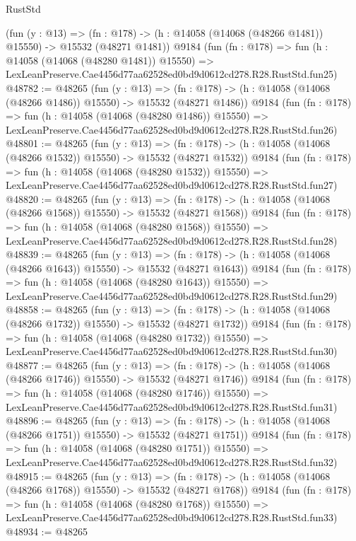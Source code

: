 \begin{lexlean}{RustStd}
\begin{coremodule}
    (fun (y : @13) =>
    (fn : @178) -> (h : @14058 (@14068 (@48266 @1481)) @15550) -> @15532 (@48271 @1481))
    @9184
    (fun (fn : @178) =>
    fun (h : @14058 (@14068 (@48280 @1481)) @15550) =>
    LexLeanPreserve.Cae4456d77aa62528ed0bd9d0612cd278.R28.RustStd.fun25)
@48782 := @48265
    (fun (y : @13) =>
    (fn : @178) -> (h : @14058 (@14068 (@48266 @1486)) @15550) -> @15532 (@48271 @1486))
    @9184
    (fun (fn : @178) =>
    fun (h : @14058 (@14068 (@48280 @1486)) @15550) =>
    LexLeanPreserve.Cae4456d77aa62528ed0bd9d0612cd278.R28.RustStd.fun26)
@48801 := @48265
    (fun (y : @13) =>
    (fn : @178) -> (h : @14058 (@14068 (@48266 @1532)) @15550) -> @15532 (@48271 @1532))
    @9184
    (fun (fn : @178) =>
    fun (h : @14058 (@14068 (@48280 @1532)) @15550) =>
    LexLeanPreserve.Cae4456d77aa62528ed0bd9d0612cd278.R28.RustStd.fun27)
@48820 := @48265
    (fun (y : @13) =>
    (fn : @178) -> (h : @14058 (@14068 (@48266 @1568)) @15550) -> @15532 (@48271 @1568))
    @9184
    (fun (fn : @178) =>
    fun (h : @14058 (@14068 (@48280 @1568)) @15550) =>
    LexLeanPreserve.Cae4456d77aa62528ed0bd9d0612cd278.R28.RustStd.fun28)
@48839 := @48265
    (fun (y : @13) =>
    (fn : @178) -> (h : @14058 (@14068 (@48266 @1643)) @15550) -> @15532 (@48271 @1643))
    @9184
    (fun (fn : @178) =>
    fun (h : @14058 (@14068 (@48280 @1643)) @15550) =>
    LexLeanPreserve.Cae4456d77aa62528ed0bd9d0612cd278.R28.RustStd.fun29)
@48858 := @48265
    (fun (y : @13) =>
    (fn : @178) -> (h : @14058 (@14068 (@48266 @1732)) @15550) -> @15532 (@48271 @1732))
    @9184
    (fun (fn : @178) =>
    fun (h : @14058 (@14068 (@48280 @1732)) @15550) =>
    LexLeanPreserve.Cae4456d77aa62528ed0bd9d0612cd278.R28.RustStd.fun30)
@48877 := @48265
    (fun (y : @13) =>
    (fn : @178) -> (h : @14058 (@14068 (@48266 @1746)) @15550) -> @15532 (@48271 @1746))
    @9184
    (fun (fn : @178) =>
    fun (h : @14058 (@14068 (@48280 @1746)) @15550) =>
    LexLeanPreserve.Cae4456d77aa62528ed0bd9d0612cd278.R28.RustStd.fun31)
@48896 := @48265
    (fun (y : @13) =>
    (fn : @178) -> (h : @14058 (@14068 (@48266 @1751)) @15550) -> @15532 (@48271 @1751))
    @9184
    (fun (fn : @178) =>
    fun (h : @14058 (@14068 (@48280 @1751)) @15550) =>
    LexLeanPreserve.Cae4456d77aa62528ed0bd9d0612cd278.R28.RustStd.fun32)
@48915 := @48265
    (fun (y : @13) =>
    (fn : @178) -> (h : @14058 (@14068 (@48266 @1768)) @15550) -> @15532 (@48271 @1768))
    @9184
    (fun (fn : @178) =>
    fun (h : @14058 (@14068 (@48280 @1768)) @15550) =>
    LexLeanPreserve.Cae4456d77aa62528ed0bd9d0612cd278.R28.RustStd.fun33)
@48934 := @48265

\end{coremodule}
\end{lexlean}
